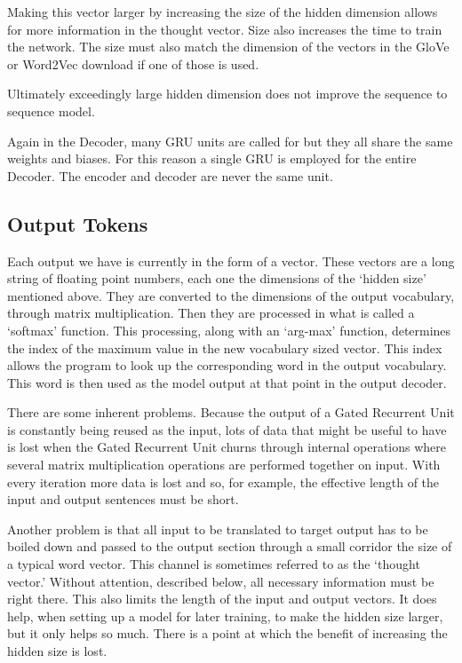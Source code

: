Making this vector larger by increasing the size of the hidden dimension allows for more information in the thought vector. Size also increases the time to train the network. The size must also match the dimension of the vectors in the GloVe or Word2Vec download if one of those is used. 

Ultimately exceedingly large hidden dimension does not improve the sequence to sequence model.

Again in the Decoder, many GRU units are called for but they all share the same weights and biases. For this reason a single GRU is employed for the entire Decoder. The encoder and decoder are never the same unit.

\subsection{Output Tokens}
Each output we have is currently in the form of a vector. These vectors are a long string of floating point numbers, each one the dimensions of the `hidden size' mentioned above. They are converted to the dimensions of the output vocabulary, through matrix multiplication. Then they are processed in what is called a `softmax' function. This processing, along with an `arg-max' function, determines the index of the maximum value in the new vocabulary sized vector. This index allows the program to look up the corresponding word in the output vocabulary. This word is then used as the model output at that point in the output decoder.

There are some inherent problems. Because the output of a Gated Recurrent Unit is constantly being reused as the input, lots of data that might be useful to have is lost when the Gated Recurrent Unit churns through internal operations where several matrix multiplication operations are performed together on input. With every iteration more data is lost and so, for example, the effective length of the input and output sentences must be short. 

Another problem is that all input to be translated to target output has to be boiled down and passed to the output section through a small corridor the size of a typical word vector. This channel is sometimes referred to as the `thought vector.' Without attention, described below, all necessary information must be right there. This also limits the length of the input and output vectors. It does help, when setting up a model for later training, to make the hidden size larger, but it only helps so much. There is a point at which the benefit of increasing the hidden size is lost.

